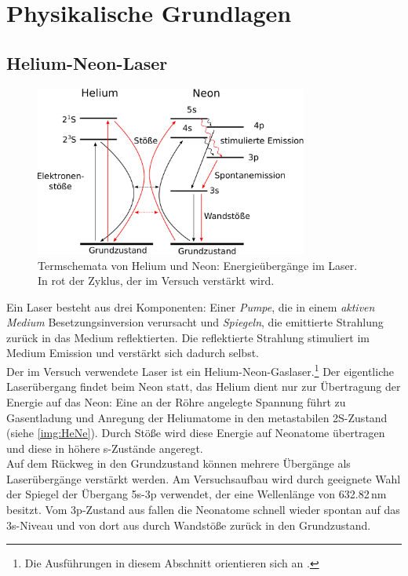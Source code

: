 \section{Physikalische Grundlagen}

\subsection{Helium-Neon-Laser}

\begin{figure}[H]
\begin{center}
  \includegraphics[width=0.8\textwidth]{../img/HeNe.pdf}
  \caption{Termschemata von Helium und Neon: Energieübergänge im Laser.
  In rot der Zyklus, der im Versuch verstärkt wird.}
  \label{img:HeNe}
\end{center}
\end{figure}

Ein Laser besteht aus drei Komponenten: Einer \emph{Pumpe},
die in einem \emph{aktiven Medium} Besetzungsinversion verursacht und \emph{Spiegeln},
die emittierte Strahlung zurück in das Medium reflektierten.
Die reflektierte Strahlung stimuliert im Medium Emission und verstärkt sich dadurch selbst.\\
Der im Versuch verwendete Laser ist ein Helium-Neon-Gaslaser.\footnote{
Die Ausführungen in diesem Abschnitt orientieren sich an \cite{dem3}.}
Der eigentliche Laserübergang findet beim Neon statt, das Helium dient nur zur Übertragung der Energie
auf das Neon:
Eine an der Röhre angelegte Spannung führt zu Gasentladung und Anregung der Heliumatome
in den metastabilen 2S-Zustand
(siehe \autoref{img:HeNe}).
Durch Stöße wird diese Energie auf Neonatome übertragen und diese in höhere s-Zustände angeregt.\\
Auf dem Rückweg in den Grundzustand können mehrere Übergänge als Laserübergänge verstärkt werden.
Am Versuchsaufbau wird durch geeignete Wahl der Spiegel
der Übergang 5s-3p verwendet, der eine Wellenlänge von 632.82\,nm besitzt.
Vom 3p-Zustand aus fallen die Neonatome schnell wieder spontan auf das 3s-Niveau und von dort aus
durch Wandstöße zurück in den Grundzustand.



